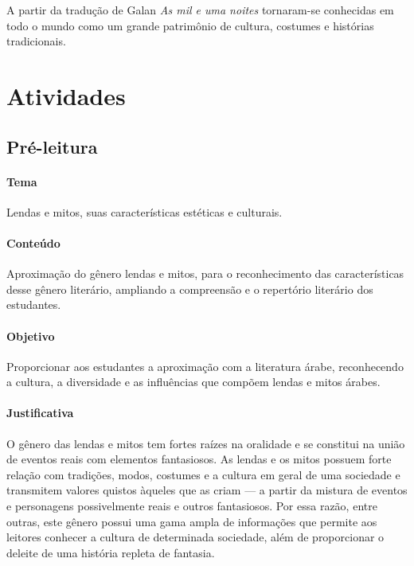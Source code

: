 \documentclass[11pt]{extarticle}
\begin{document}
A partir da tradução de Galan \textit{As mil e uma noites} tornaram-se conhecidas em todo o mundo como um grande patrimônio de cultura, costumes e histórias tradicionais.


\section{Atividades}

\subsection{Pré-leitura}

\paragraph{Tema} Lendas e mitos, suas características estéticas e culturais.

\paragraph{Conteúdo} Aproximação do gênero lendas e mitos, para o reconhecimento das características desse gênero literário, ampliando a compreensão e o repertório literário dos estudantes.

\paragraph{Objetivo} Proporcionar aos estudantes a aproximação com a literatura árabe, reconhecendo a cultura, a diversidade e as influências que compõem lendas e mitos árabes.

\paragraph{Justificativa} O gênero das lendas e mitos tem fortes raízes na oralidade e se constitui na união de eventos reais com elementos fantasiosos. As lendas e os mitos possuem forte relação com tradições, modos, costumes e a cultura em geral de uma sociedade e transmitem valores quistos àqueles que as criam --- a partir da mistura de eventos e personagens possivelmente reais e outros fantasiosos. Por essa razão, entre outras, este gênero possui uma gama ampla de informações que permite aos leitores conhecer a cultura de determinada sociedade, além de proporcionar o deleite de uma história repleta de fantasia. 
\end{document}
